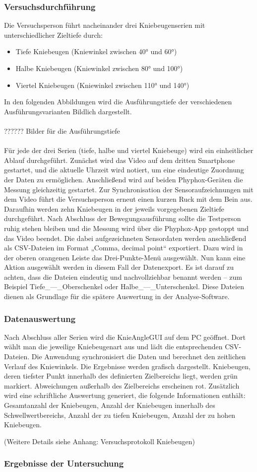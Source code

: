 \subsubsection{Versuchsdurchführung}
\noindent Die Versuchsperson führt nacheinander drei Kniebeugenserien mit unterschiedlicher Zieltiefe durch:
\begin{itemize}
    \item Tiefe Kniebeugen (Kniewinkel zwischen 40° und 60°)
    \item Halbe Kniebeugen (Kniewinkel zwischen 80° und 100°)
    \item Viertel Kniebeugen (Kniewinkel zwischen 110° und 140°) \cite{Hartmann2014}
\end{itemize}
\noindent In den folgenden Abbildungen wird die Ausführungstiefe der verschiedenen Ausführungsvarianten Bildlich dargestellt. 
\\
\\
?????? Bilder für die Ausführungstiefe
\\
\\
\noindent Für jede der drei Serien (tiefe, halbe und viertel Kniebeuge) wird ein einheitlicher Ablauf durchgeführt. Zunächst wird das Video auf dem dritten Smartphone gestartet, und die aktuelle Uhrzeit wird notiert, um eine eindeutige Zuordnung der Daten zu ermöglichen. Anschließend wird auf beiden Phyphox-Geräten die Messung gleichzeitig gestartet. Zur Synchronisation der Sensoraufzeichnungen mit dem Video führt die Versuchsperson erneut einen kurzen Ruck mit dem Bein aus.
\noindent Daraufhin werden zehn Kniebeugen in der jeweils vorgegebenen Zieltiefe durchgeführt. Nach Abschluss der Bewegungsausführung sollte die Testperson ruhig stehen bleiben und die Messung wird  über die Phyphox-App gestoppt und das Video beendet. Die dabei aufgezeichneten Sensordaten werden anschließend als CSV-Dateien im Format „Comma, decimal point“ exportiert. Dazu wird in der oberen orangenen Leiste das Drei-Punkte-Menü ausgewählt. Nun kann eine Aktion ausgewählt werden in diesem Fall der Datenexport. Es ist darauf zu achten, dass die Dateien eindeutig und nachvollziehbar benannt werden – zum Beispiel Tiefe\_---\_Oberschenkel oder Halbe\_---\_Unterschenkel. Diese Dateien dienen als Grundlage für die spätere Auswertung in der Analyse-Software. 

\subsubsection{Datenauswertung}
\noindent Nach Abschluss aller Serien wird die KnieAngleGUI auf dem PC geöffnet. Dort wählt man die jeweilige Kniebeugenart aus und lädt die entsprechenden CSV-Dateien. Die Anwendung synchronisiert die Daten und berechnet den zeitlichen Verlauf des Kniewinkels.
\noindent Die Ergebnisse werden grafisch dargestellt. Kniebeugen, deren tiefster Punkt innerhalb des definierten Zielbereichs liegt, werden grün markiert. Abweichungen außerhalb des Zielbereichs erscheinen rot. Zusätzlich wird eine schriftliche Auswertung generiert, die folgende Informationen enthält: Gesamtanzahl der Kniebeugen, Anzahl der Kniebeugen innerhalb des Schwellwertbereichs, Anzahl der zu tiefen Kniebeugen, Anzahl der zu hohen Kniebeugen. 

\noindent (Weitere Details siehe Anhang: Versuchsprotokoll Kniebeugen) 

\subsubsection{Ergebnisse der Untersuchung}

